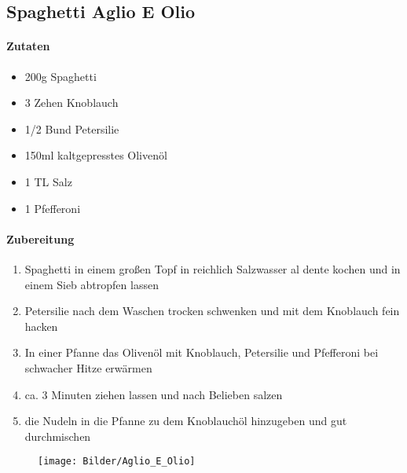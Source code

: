 \newpage
\subsection{Spaghetti Aglio E Olio}
\paragraph{Zutaten}
\begin{itemize}[noitemsep]
	\item 200g Spaghetti
	\item 3 Zehen Knoblauch
	\item 1/2 Bund Petersilie
	\item 150ml kaltgepresstes Olivenöl
	\item 1 TL Salz
	\item 1 Pfefferoni
\end{itemize}
\paragraph{Zubereitung}
\begin{enumerate}[noitemsep]
	\item Spaghetti in einem großen Topf in reichlich Salzwasser al dente kochen und in einem Sieb abtropfen lassen
	\item Petersilie nach dem Waschen trocken schwenken und mit dem Knoblauch fein hacken
	\item In einer Pfanne das Olivenöl mit Knoblauch, Petersilie und Pfefferoni bei schwacher Hitze erwärmen 
	\item ca. 3 Minuten ziehen lassen und nach Belieben salzen
	\item die Nudeln in die Pfanne zu dem Knoblauchöl hinzugeben und gut durchmischen
\end{enumerate}
\vspace{0.7cm}
\begin{figure}[h]
\centering
\texttt{[image: Bilder/Aglio\_E\_Olio]}
\end{figure}
